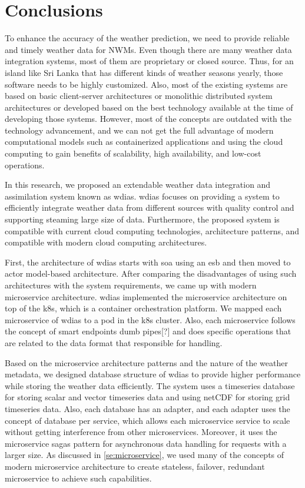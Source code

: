 \section{Conclusions}
\label{se:summary_conclusion}

To enhance the accuracy of the weather prediction, we need to provide reliable and timely weather data for NWMs. Even though there are many weather data integration systems, most of them are proprietary or closed source. Thus, for an island like Sri Lanka that has different kinds of weather seasons yearly, those software needs to be highly customized. Also, most of the existing systems are based on basic client-server architectures or monolithic distributed system architectures or developed based on the best technology available at the time of developing those systems. However, most of the concepts are outdated with the technology advancement, and we can not get the full advantage of modern computational models such as containerized applications and using the cloud computing to gain benefits of scalability, high availability, and low-cost operations.

In this research, we proposed an extendable weather data integration and assimilation system known as \acrfull{wdias}. \acrshort{wdias} focuses on providing a system to efficiently integrate weather data from different sources with quality control and supporting steaming large size of data. Furthermore, the proposed system is compatible with current cloud computing technologies, architecture patterns, and compatible with modern cloud computing architectures.

First, the architecture of \acrshort{wdias} starts with \acrshort{soa} using an \acrfull{esb} and then moved to actor model-based architecture. After comparing the disadvantages of using such architectures with the system requirements, we came up with modern microservice architecture. \acrshort{wdias} implemented the microservice architecture on top of the \acrshort{k8s}, which is a container orchestration platform. We mapped each microservice of \acrshort{wdias} to a pod in the \acrshort{k8s} cluster. Also, each microservice follows the concept of smart endpoints dumb pipes[?] and does specific operations that are related to the data format that responsible for handling.

Based on the microservice architecture patterns and the nature of the weather metadata, we designed database structure of \acrshort{wdias} to provide higher performance while storing the weather data efficiently. The system uses a timeseries database for storing scalar and vector timeseries data and using netCDF for storing grid timeseries data. Also, each database has an adapter, and each adapter uses the concept of database per service, which allows each microservice service to scale without getting interference from other microservices.
Moreover, it uses the microservice sagas pattern for asynchronous data handling for requests with a larger size. As discussed in \cref{se:microservice}, we used many of the concepts of modern microservice architecture to create stateless, failover, redundant microservice to achieve such capabilities.

